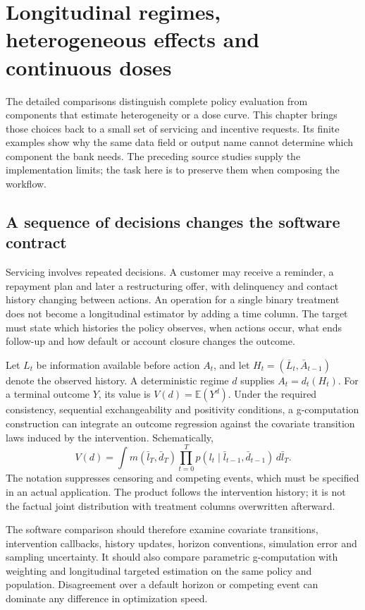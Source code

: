 \chapter{Longitudinal regimes, heterogeneous effects and continuous doses}
\label{v13:sw-regimes}

The detailed comparisons distinguish complete policy evaluation from components
that estimate heterogeneity or a dose curve. This chapter brings those choices
back to a small set of servicing and incentive requests. Its finite examples
show why the same data field or output name cannot determine which component
the bank needs. The preceding source studies supply the implementation limits;
the task here is to preserve them when composing the workflow.

\section{A sequence of decisions changes the software contract}

Servicing involves repeated decisions. A customer may receive a reminder, a
repayment plan and later a restructuring offer, with delinquency and contact
history changing between actions. An operation for a single binary treatment
does not become a longitudinal estimator by adding a time column. The target
must state which histories the policy observes, when actions occur, what ends
follow-up and how default or account closure changes the outcome.

Let $L_t$ be information available before action $A_t$, and let
$H_t=(\bar L_t,\bar A_{t-1})$ denote the observed history. A deterministic regime
$d$ supplies $A_t=d_t(H_t)$. For a terminal outcome $Y$, its value is
$V(d)=\mathbb E(Y^d)$. Under the required consistency, sequential
exchangeability and positivity conditions, a g-computation construction can
integrate an outcome regression against the covariate transition laws induced
by the intervention. Schematically,
\[
 V(d)=\int m(\bar l_T,\bar d_T)
             \prod_{t=0}^{T}p(l_t\mid\bar l_{t-1},\bar d_{t-1})
             \,d\bar l_T.
\]
The notation suppresses censoring and competing events, which must be specified
in an actual application. The product follows the intervention history; it is
not the factual joint distribution with treatment columns overwritten afterward.

The software comparison should therefore examine covariate transitions,
intervention callbacks, history updates, horizon conventions, simulation error
and sampling uncertainty. It should also compare parametric g-computation with
weighting and longitudinal targeted estimation on the same policy and population.
Disagreement over a default horizon or competing event can dominate any
difference in optimization speed.

